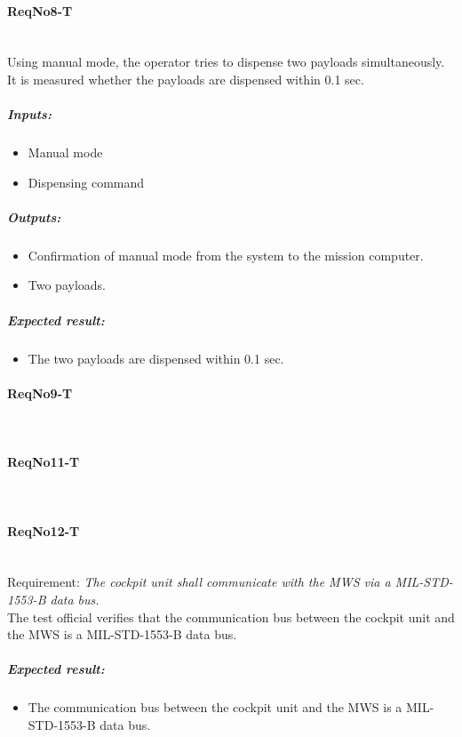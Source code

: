 \paragraph{ReqNo8-T}\mbox{}\\ %
Using manual mode, the operator tries to dispense two payloads simultaneously. It is measured whether the payloads are dispensed within 0.1 sec.
\\
	\subparagraph{Inputs:}
	\begin{itemize}
	\item Manual mode
	\item Dispensing command
	\end{itemize}
	\subparagraph{Outputs:}
	\begin{itemize}
	\item Confirmation of manual mode from the system to the mission computer.
	\item Two payloads.
	\end{itemize}
	\subparagraph{Expected result:}
	\begin{itemize}
	\item The two payloads are dispensed within 0.1 sec.
	\end{itemize}

\paragraph{ReqNo9-T}\mbox{}\\ %


\paragraph{ReqNo11-T}\mbox{}\\ %

\paragraph{ReqNo12-T}\mbox{}\\ %
Requirement: \textit{The cockpit unit shall communicate with the MWS via a MIL-STD-1553-B data bus.}\\
The test official verifies that the communication bus between the cockpit unit and the MWS is a MIL-STD-1553-B data bus.

\subparagraph{Expected result:}
	\begin{itemize}
	\item The communication bus between the cockpit unit and the MWS is a MIL-STD-1553-B data bus.
	\end{itemize}

